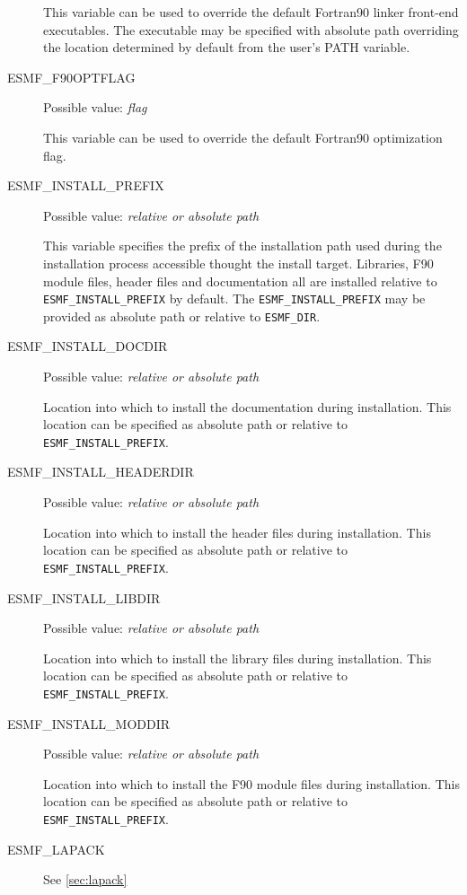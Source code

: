 \begin{description}
This variable can be used to override the default Fortran90 linker
front-end executables. The executable may be specified with absolute path
overriding the location determined by default from the user's PATH variable.

\item[ESMF\_F90OPTFLAG]
Possible value: {\em flag}

This variable can be used to override the default  Fortran90 optimization flag.

\item[ESMF\_INSTALL\_PREFIX]
Possible value: {\em relative or absolute path}

This variable specifies the prefix of the installation path used during the
installation process accessible thought the install target. Libraries, F90
module files, header files and documentation all are installed relative to
{\tt ESMF\_INSTALL\_PREFIX} by default. The {\tt ESMF\_INSTALL\_PREFIX} may be
provided as absolute path or relative to {\tt ESMF\_DIR}.

\item[ESMF\_INSTALL\_DOCDIR]
Possible value: {\em relative or absolute path}

Location into which to install the documentation during installation. This
location can be specified as absolute path or relative to
{\tt ESMF\_INSTALL\_PREFIX}.

\item[ESMF\_INSTALL\_HEADERDIR]
Possible value: {\em relative or absolute path}

Location into which to install the header files during installation. This
location can be specified as absolute path or relative to
{\tt ESMF\_INSTALL\_PREFIX}.

\item[ESMF\_INSTALL\_LIBDIR]
Possible value: {\em relative or absolute path}

Location into which to install the library files during installation. This
location can be specified as absolute path or relative to
{\tt ESMF\_INSTALL\_PREFIX}.

\item[ESMF\_INSTALL\_MODDIR]
Possible value: {\em relative or absolute path}

Location into which to install the F90 module files during installation. This
location can be specified as absolute path or relative to
{\tt ESMF\_INSTALL\_PREFIX}.

\item[ESMF\_LAPACK]
See \ref{sec:lapack}


\end{description}
